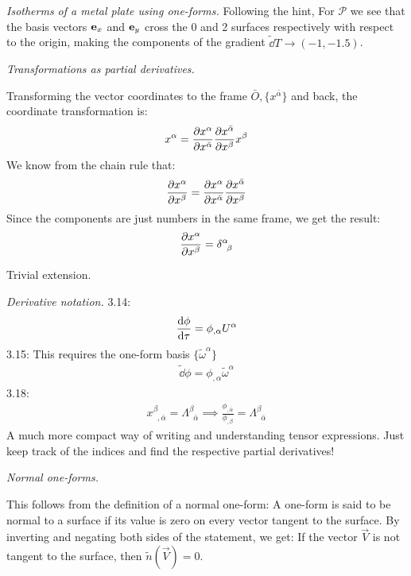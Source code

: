\documentclass{report}
\begin{document}
\begin{subquests}
	\item \emph{Isotherms of a metal plate using one-forms.}
	Following the hint, For $\mathcal{P}$ we see that the basis vectors ${\vb e}_x$ and ${\vb e}_y$ cross the 0 and 2 surfaces respectively with respect to the origin, making the components of the gradient $\tilde {\dd}T \longrightarrow (-1,-1.5)$.

	\item \emph{Transformations as partial derivatives.}
	\begin{subquests}
		\item
		Transforming the vector coordinates to the frame $\bar O, \{x^{\bar \alpha}\}$ and back, the coordinate transformation is:
		\begin{gather*}
			x^{\alpha} = \pdv{x^{\alpha}}{x^{\bar\alpha}} \pdv{x^{\bar\alpha}}{x^{\beta}} x^{\beta}
		\end{gather*}
		We know from the chain rule that:
		\begin{gather*}
		 	\pdv{x^{\alpha}}{x^{\beta}} = \pdv{x^{\alpha}}{x^{\bar\alpha}} \pdv{x^{\bar\alpha}}{x^{\beta}}
		\end{gather*} 
		Since the components are just numbers in the same frame, we get the result:
		\begin{gather*}
			\pdv{x^{\alpha}}{x^{\beta}} = \delta^{\alpha}_{\;\;\beta}
		\end{gather*}
		
		\item Trivial extension.
	\end{subquests}

	\item \emph{Derivative notation.}
	3.14:
	\begin{gather*}
	 	\dv{\phi}{\tau} = \phi_{,\alpha}U^{\alpha} 
	\end{gather*} 
	3.15: This requires the one-form basis $\{\tilde \omega^{\alpha}\}$
	\begin{gather*}
	 	\tilde{\dd}\phi = \phi_{,\alpha}\tilde \omega^{\alpha} 
	\end{gather*} 
	3.18:
	\begin{gather*}
	 	x^{\beta}_{\;\;,\bar\alpha} = \Lambda^{\beta}_{\;\;\bar\alpha} \implies	\frac{\phi_{,\bar\alpha}}{\phi_{,\beta}} =\Lambda^{\beta}_{\;\;\bar\alpha} 
	\end{gather*} 
	A much more compact way of writing and understanding tensor expressions. Just keep track of the indices and find the respective partial derivatives!

	\item \emph{Normal one-forms.}
	\begin{subquests}
		\item
		This follows from the definition of a normal one-form: A one-form is said to be normal to a surface if its value is zero on every vector tangent to the surface. By inverting and negating both sides of the statement, we get: If the vector $\vec V$ is not tangent to the surface, then $\tilde n(\vec V) = 0$.


\end{subquests}
\end{subquests}
\end{document}
